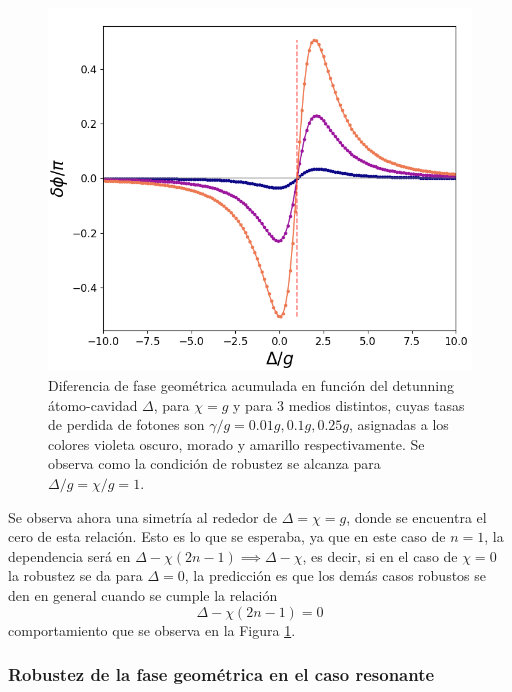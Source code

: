 \begin{figure}[H]
    \begin{minipage}[c]{0.67\textwidth}
        \includegraphics[width=\textwidth]{figuras/ch3/robustez x=g.png}
    \end{minipage}\hfill
    \begin{minipage}[c]{0.3\textwidth}
    \caption{Diferencia de fase geométrica acumulada en función del detunning átomo-cavidad $\Delta$, para $\chi=g$ y para 3 medios distintos, cuyas tasas de perdida de fotones son $\gamma/g=0.01g,0.1g,0.25g$, asignadas a los colores violeta oscuro, morado y amarillo respectivamente. Se observa como la condición de robustez se alcanza para $\Delta/g=\chi/g=1$.}
    \label{fig3:robustez mixta}
  \end{minipage}
\end{figure}
Se observa ahora una simetría al rededor de $\Delta=\chi=g$, donde se encuentra el cero de esta relación. Esto es lo que se esperaba, ya que en este caso de $n=1$, la dependencia será en $\Delta-\chi(2n-1) \implies \Delta-\chi$, es decir, si en el caso de $\chi=0$ la robustez se da para $\Delta=0$, la predicción es que los demás casos robustos se den en general cuando se cumple la relación 
\begin{equation}\label{ec3:condicion robuestez 1 atomo}
        \Delta-\chi(2n-1)=0
\end{equation}
comportamiento que se observa en la Figura \ref{fig3:robustez mixta}.
\subsubsection{Robustez de la fase geométrica en el caso resonante}

